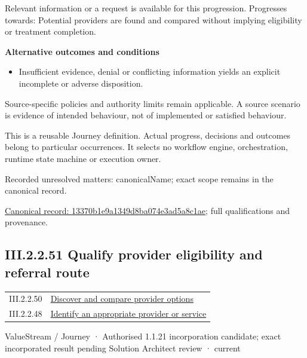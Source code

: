 Relevant information or a request is available for this progression. Progresses towards: Potential providers are found and compared without implying eligibility or treatment completion.



\par\medskip\textbf{Alternative outcomes and conditions}\par


\begin{itemize}


\item Insufficient evidence, denial or conflicting information yields an explicit incomplete or adverse disposition.

\end{itemize}


Source-specific policies and authority limits remain applicable. A source scenario is evidence of intended behaviour, not of implemented or satisfied behaviour.



This is a reusable Journey definition. Actual progress, decisions and outcomes belong to particular occurrences. It selects no workflow engine, orchestration, runtime state machine or execution owner.


{\small Recorded unresolved matters: canonicalName; exact scope remains in the canonical record.}\par
{\footnotesize \href{../../../../continuum/strategy/value-stream/13370b1e9a1349d8ba074e3ad5a8c1ae.md}{Canonical record: 13370b1e9a1349d8ba074e3ad5a8c1ae}; full qualifications and provenance.}\par
\subsection*{III.2.2.51 Qualify provider eligibility and referral route}
\label{navigation:III.2.2.51}

\begin{longtable}{p{.22\linewidth}p{.73\linewidth}}
III.2.2.50 & \hyperref[element:13370b1e9a1349d8ba074e3ad5a8c1ae]{Discover and compare provider options} \\
III.2.2.48 & \hyperref[element:5d725d797f754857bf1b3d49d8f25044]{Identify an appropriate provider or service} \\
\end{longtable}
\label{element:1406d16dbefa4752af95ca6041cd5712}
{\small ValueStream / Journey · Authorised 1.1.21 incorporation candidate; exact incorporated result pending Solution Architect review · current}\par

